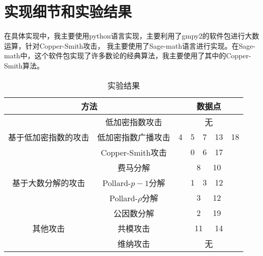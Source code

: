\documentclass{ctexart}
\begin{document}
\section{实现细节和实验结果}
在具体实现中，我主要使用python语言实现，主要利用了gmpy2的软件包进行大数运算，针对Copper-Smith攻击，
我主要使用了Sage-math语言进行实现。在Sage-math中，这个软件包实现了许多数论的经典算法，我主要使用了其中的Copper-Smith算法。
\begin{table*}[t]
    \begin{tabular}{c|c|ccccc}
    \toprule[1pt]
    
    \multicolumn{2}{c|}{方法}& \multicolumn{5}{c}{数据点} \\
    \hline

    \multirow{3}{*}{基于低加密指数的攻击} &低加密指数攻击&\multicolumn{5}{c}{无}   \\
    &低加密指数广播攻击&4&5&7&13&18\\
    &Copper-Smith攻击& &0&6&17&  \\
    \hline
    \multirow{3}{*}{基于大数分解的攻击} &费马分解& \multicolumn{5}{c}{8\ \ \ 10} \\
    &Pollard-$p-1$分解& &1&3&12& \\
    &Pollard-$\rho$分解& \multicolumn{5}{c}{3\ \ \ 12}\\
    \hline
    \multirow{3}{*}{其他攻击} &公因数分解& \multicolumn{5}{c}{2\ \ \ 19}\\
    &共模攻击&\multicolumn{5}{c}{11\ \ \ 14}\\
    &维纳攻击&\multicolumn{5}{c}{无}\\
    \bottomrule[1pt]
    \end{tabular}
    \centering
    \caption{实验结果}
    \label{ablation}
\end{table*}
\end{document}
